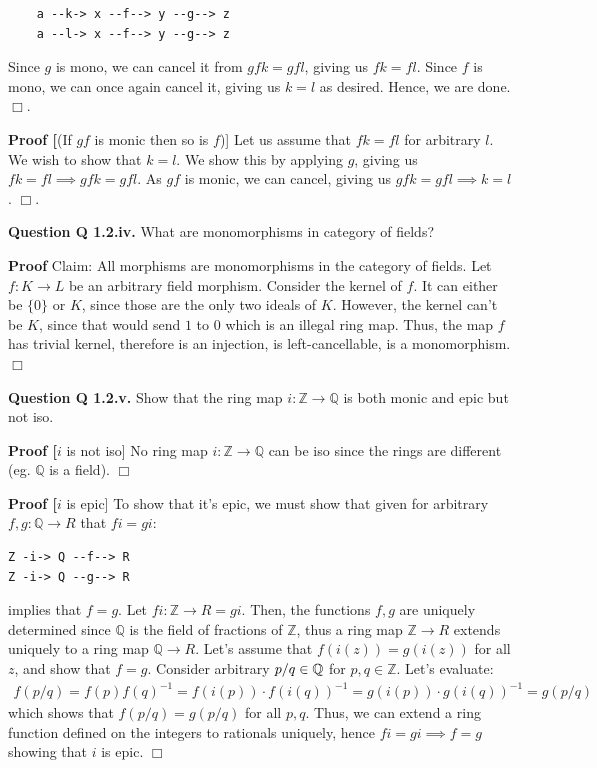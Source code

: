 \documentclass[11pt]{report}
\newcommand{\Z}{\ensuremath{\mathbb{Z}}}
\newcommand{\Q}{\ensuremath{\mathbb{Q}}}
\def\qed{$\Box$}
\newcommand*{\question}[1]{\leavevmode\newline \textbf{Question #1.}}
\newcommand*{\proof}[1]{\leavevmode\newline \textbf{Proof #1}}
\begin{document}
\begin{verbatim}
    a --k-> x --f--> y --g--> z
    a --l-> x --f--> y --g--> z
\end{verbatim}

Since $g$ is mono, we can cancel it from $gfk = gfl$, giving us $fk = fl$.
Since $f$ is mono, we can once again cancel it, giving us $k = l$ as desired.
Hence, we are done.  \qed.

\proof[(If $gf$ is monic then so is $f$)]
Let us assume that $fk = fl$ for arbitrary $l$. We wish to show that $k = l$. We show this
by applying $g$, giving us $fk = fl \implies gfk = gfl$. As $gf$ is monic, we can cancel, giving
us $gfk = gfl \implies k = l$. 
\qed.

\question{Q 1.2.iv} What are monomorphisms in category of fields?

\proof{} Claim: All morphisms are monomorphisms in the category of fields. Let $f: K \rightarrow L$ be an arbitrary field
morphism. Consider the kernel of $f$. It can either be $\{ 0 \}$ or $K$, since those are the only two
ideals of $K$. However, the kernel can't be $K$, since that would send $1$ to $0$ which is an illegal ring map.
Thus, the map $f$ has trivial kernel, therefore is an injection, is left-cancellable, is a monomorphism.\qed


\question{Q 1.2.v} Show that the ring map $i: \mathbb Z \rightarrow \mathbb Q$ is both monic and epic but not iso.

\proof[$i$ is not iso]
No ring map $i: \mathbb Z \rightarrow \mathbb Q$ can be iso since the rings are different (eg. $\mathbb Q$ is a field). \qed



\proof[$i$ is epic]
To show that it's epic, we must show that given for arbitrary $f, g: \mathbb Q \rightarrow R$ that $fi = gi$:

\begin{verbatim}
Z -i-> Q --f--> R
Z -i-> Q --g--> R
\end{verbatim}

implies that $f = g$. Let $fi: \mathbb Z \rightarrow R = gi$. Then, the functions $f, g$ are uniquely determined
since $\mathbb Q$ is the field of fractions of $\mathbb Z$, thus a ring map $\Z \rightarrow R$ extends uniquely to a ring
map $\Q \rightarrow R$. Let's assume that $f(i(z)) = g(i(z))$ for all $z$, and show that $f = g$.
Consider arbitrary $p/q \in \mathbb \Q$ for $p, q \in \Z$. Let's evaluate:
\begin{align*}
f(p/q) = f(p)f(q)^{-1} = f(i(p)) \cdot f(i(q))^{-1} = g(i(p)) \cdot g(i(q))^{-1} = g(p/q)
\end{align*}
which shows that $f(p/q) = g(p/q)$ for all $p, q$. Thus, we can extend a ring function defined on the integers to rationals uniquely,
hence $fi = gi \implies f = g$ showing that $i$ is epic.
\qed
\end{document}
